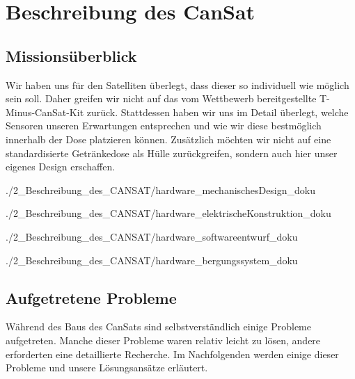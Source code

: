 \section{Beschreibung des CanSat}


\subsection{Missionsüberblick}
Wir haben uns für den Satelliten überlegt, dass dieser so individuell wie möglich sein soll. Daher greifen wir nicht auf das vom Wettbewerb bereitgestellte T-Minus-CanSat-Kit zurück. Stattdessen haben wir uns im Detail überlegt, welche Sensoren unseren Erwartungen entsprechen und wie wir diese bestmöglich innerhalb der Dose platzieren können. Zusätzlich möchten wir nicht auf eine standardisierte Getränkedose als Hülle zurückgreifen, sondern auch hier unser eigenes Design erschaffen.

 {./2_Beschreibung_des_CANSAT/hardware_mechanischesDesign_doku}

 {./2_Beschreibung_des_CANSAT/hardware_elektrischeKonstruktion_doku}

 {./2_Beschreibung_des_CANSAT/hardware_softwareentwurf_doku}

 {./2_Beschreibung_des_CANSAT/hardware_bergungssystem_doku}

\subsection{Aufgetretene Probleme}
Während des Baus des CanSats sind selbstverständlich einige Probleme aufgetreten. Manche dieser Probleme waren relativ leicht zu lösen, andere erforderten eine detaillierte Recherche. Im Nachfolgenden werden einige dieser Probleme und unsere Lösungsansätze erläutert.

